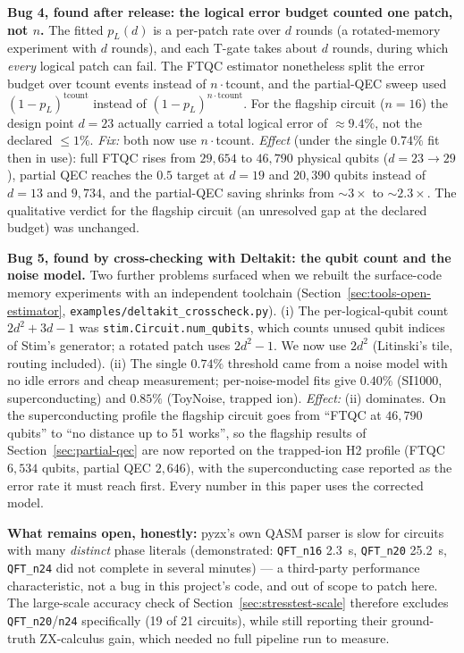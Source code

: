 \documentclass[9pt,twocolumn]{extarticle}
\begin{document}
\textbf{Bug 4, found after release: the logical error budget counted one
patch, not $n$.} The fitted $p_L(d)$ is a per-patch rate over $d$ rounds
(a rotated-memory experiment with $d$ rounds), and each T-gate takes about
$d$ rounds, during which \emph{every} logical patch can fail. The FTQC
estimator nonetheless split the error budget over tcount events instead of
$n\cdot$tcount, and the partial-QEC sweep used $(1-p_L)^{\text{tcount}}$
instead of $(1-p_L)^{n\cdot\text{tcount}}$. For the flagship circuit
($n=16$) the design point $d=23$ actually carried a total logical error
of $\approx9.4\%$, not the declared $\le1\%$. \emph{Fix:} both now use
$n\cdot$tcount. \emph{Effect} (under the single $0.74\%$ fit then in use): full FTQC rises from $29{,}654$ to
$46{,}790$ physical qubits ($d=23\to29$), partial QEC reaches the $0.5$
target at $d=19$ and $20{,}390$ qubits instead of $d=13$ and $9{,}734$, and
the partial-QEC saving shrinks from $\sim\!3\times$ to $\sim\!2.3\times$.
The qualitative verdict for the flagship circuit (an unresolved gap at the
declared budget) was unchanged.

\textbf{Bug 5, found by cross-checking with Deltakit: the qubit count and
the noise model.} Two further problems surfaced when we rebuilt the
surface-code memory experiments with an independent toolchain
(Section~\ref{sec:tools-open-estimator}, \texttt{examples/deltakit\_crosscheck.py}).
(i) The per-logical-qubit count $2d^2+3d-1$ was \texttt{stim.Circuit.num\_qubits},
which counts unused qubit indices of Stim's generator; a rotated patch uses
$2d^2-1$. We now use $2d^2$ (Litinski's tile, routing included). (ii) The
single $0.74\%$ threshold came from a noise model with no idle errors and
cheap measurement; per-noise-model fits give $0.40\%$ (SI1000,
superconducting) and $0.85\%$ (ToyNoise, trapped ion). \emph{Effect:} (ii)
dominates. On the superconducting profile the flagship circuit goes from
``FTQC at $46{,}790$ qubits'' to ``no distance up to 51 works'', so the
flagship results of Section~\ref{sec:partial-qec} are now reported on the
trapped-ion H2 profile (FTQC $6{,}534$ qubits, partial QEC $2{,}646$), with
the superconducting case reported as the error rate it must reach first.
Every number in this paper uses the corrected model.

\textbf{What remains open, honestly:} pyzx's own QASM parser is slow for
circuits with many \emph{distinct} phase literals (demonstrated:
\texttt{QFT\_n16} 2.3~s, \texttt{QFT\_n20} 25.2~s, \texttt{QFT\_n24} did
not complete in several minutes) --- a third-party performance
characteristic, not a bug in this project's code, and out of scope to
patch here. The large-scale accuracy check of
Section~\ref{sec:stresstest-scale} therefore excludes
\texttt{QFT\_n20}/\texttt{n24} specifically (19 of 21 circuits), while
still reporting their ground-truth ZX-calculus gain, which needed no full
pipeline run to measure.
\end{document}
